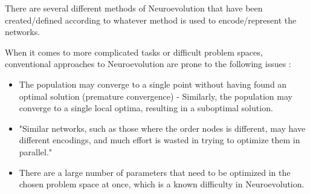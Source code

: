There are several different methods of Neuroevolution that have been created/defined according to whatever method is used to encode/represent the networks.




When it comes to more complicated tasks or difficult problem spaces, conventional approaches to Neuroevolution are prone to the following issues \cite{Miikkulainen2010}:
\begin{itemize}
	\item The population may converge to a single point without having found an optimal solution (premature convergence) - Similarly, the population may converge to a single local optima, resulting in a suboptimal solution. 
	\item "Similar networks, such as those where the order nodes is different, may have different encodings, and much effort is wasted in trying to optimize them in parallel."
	\item There are a large number of parameters that need to be optimized in the chosen problem space at once, which is a known difficulty in Neuroevolution.
\end{itemize}





